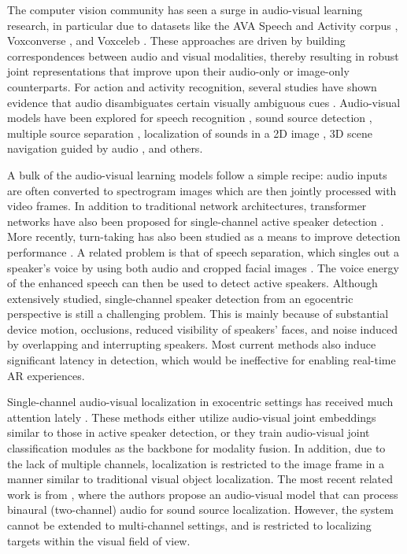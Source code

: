 \documentclass[10pt,twocolumn,letterpaper]{article}
\begin{document}
The computer vision community has seen a surge in audio-visual learning research, 
in particular due to datasets like the AVA Speech and Activity corpus \cite{avadataset}, Voxconverse \cite{voxconverse}, and Voxceleb \cite{voxceleb2}. 
These approaches are driven by building correspondences between audio and visual modalities, thereby resulting in 
robust joint representations that improve upon their audio-only or image-only counterparts. 
For action and activity recognition, several studies have shown evidence that audio disambiguates certain visually ambiguous cues 
\cite{kazakos2019epic,audiovisual-slowfast}. 
Audio-visual models have been explored for speech recognition \cite{avspeech}, 
sound source detection \cite{avloc1, avloc2, avloc3}, multiple source separation \cite{avsep2, avsep4, avsep5, avsep6}, 
localization of sounds in a 2D image \cite{360sound, avsep1}, 3D scene navigation guided by audio \cite{avnavi}, and others. 

A bulk of the audio-visual learning models follow a simple recipe: 
audio inputs are often converted to spectrogram images which are then jointly processed with video frames.
In addition to traditional network architectures, 
transformer networks have also been proposed for single-channel active speaker detection \cite{talknet}.
More recently, turn-taking has also been studied as a means to improve detection performance \cite{iccv21b}.
A related problem is that of speech separation, which singles out
a speaker's voice by using both audio and cropped facial images \cite{avsep2, avsep5, avsep6}. 
The voice energy of the enhanced speech can then be used to detect active speakers.
Although extensively studied, single-channel speaker detection from an egocentric perspective is still a challenging problem. 
This is mainly because of substantial device motion, 
occlusions, reduced visibility of speakers' faces, and noise induced by overlapping and interrupting speakers. 
Most current methods also induce significant latency in detection, which would be ineffective for enabling real-time AR experiences. 

Single-channel audio-visual localization in exocentric 
settings has received much attention lately 
\cite{av1, avloc1, avloc2, avloc3, iccv21a}.
These methods either utilize audio-visual joint embeddings similar to those in active speaker detection, 
or they train audio-visual joint classification modules as the backbone for modality fusion. 
In addition, due to the lack of multiple channels, localization is restricted to the image frame 
in a manner similar to traditional visual object localization.
The most recent related work is from \cite{wangaaai}, where the authors propose an audio-visual model 
that can process binaural (two-channel) audio for sound source localization. 
However, the system cannot be extended to multi-channel settings, and is restricted to localizing targets within the visual field of view. 
\end{document}
